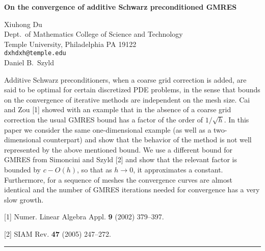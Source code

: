 \documentclass[twosided]{report}
\begin{document}
\begin{center}
{\large			%
{\bf On the convergence of additive Schwarz preconditioned GMRES}}

	Xiuhong Du \\
	Dept.~of Mathematics College of Science and Technology \\
	Temple University, Philadelphia PA 19122 \\
	{\tt dxhdxh@temple.edu} \\
	Daniel B.~Szyld
\end{center}
Additive Schwarz preconditioners, when a coarse grid
correction is added, are said to be optimal for certain
discretized PDE problems, in the sense that bounds on the
convergence of iterative methods are independent on the mesh
size. Cai and Zou [1]
showed with an
example that in the absence of a coarse grid correction the
usual GMRES bound has a factor of the order of $1/\sqrt h$.
In this paper we consider the same one-dimensional example
(as well as a two-dimensional counterpart) and show that the
behavior of the method is not well represented by the above
mentioned bound. We use a different bound for GMRES from
Simoncini and Szyld [2]
and show that the relevant factor is
bounded by $c-O(h)$, so that as $h\rightarrow 0$, it
approximates a constant. Furthermore, for a sequence of
meshes the convergence curves are almost identical and the
number of GMRES iterations needed for convergence has a very
slow growth.

[1] Numer. Linear Algebra Appl. {\bf 9} (2002) 379--397.

[2] SIAM Rev. {\bf 47} (2005) 247--272.


	\begin{center} \rule{6in}{1pt} \end{center}
\end{document}
